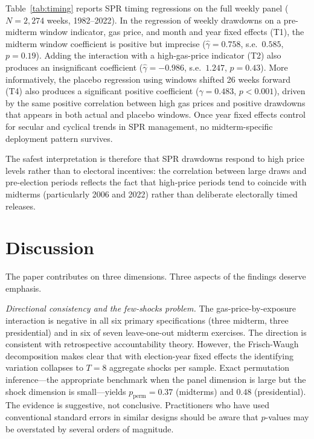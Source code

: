 \documentclass[12pt]{article}
\begin{document}
Table~\ref{tab:timing} reports SPR timing regressions on the full weekly panel ($N=2{,}274$ weeks, 1982--2022). In the regression of weekly drawdowns on a pre-midterm window indicator, gas price, and month and year fixed effects (T1), the midterm window coefficient is positive but imprecise ($\hat\gamma=0.758$, s.e.\ $0.585$, $p=0.19$). Adding the interaction with a high-gas-price indicator (T2) also produces an insignificant coefficient ($\hat\gamma=-0.986$, s.e.\ $1.247$, $p=0.43$). More informatively, the placebo regression using windows shifted 26 weeks forward (T4) also produces a significant positive coefficient ($\hat\gamma=0.483$, $p<0.001$), driven by the same positive correlation between high gas prices and positive drawdowns that appears in both actual and placebo windows. Once year fixed effects control for secular and cyclical trends in SPR management, no midterm-specific deployment pattern survives.

The safest interpretation is therefore that SPR drawdowns respond to high price levels rather than to electoral incentives: the correlation between large draws and pre-election periods reflects the fact that high-price periods tend to coincide with midterms (particularly 2006 and 2022) rather than deliberate electorally timed releases.

\section{Discussion}
\label{sec:discuss}

The paper contributes on three dimensions. Three aspects of the findings deserve emphasis.

\textit{Directional consistency and the few-shocks problem.} The gas-price-by-exposure interaction is negative in all six primary specifications (three midterm, three presidential) and in six of seven leave-one-out midterm exercises. The direction is consistent with retrospective accountability theory. However, the Frisch-Waugh decomposition makes clear that with election-year fixed effects the identifying variation collapses to $T=8$ aggregate shocks per sample. Exact permutation inference---the appropriate benchmark when the panel dimension is large but the shock dimension is small---yields $p_{\text{perm}}=0.37$ (midterms) and $0.48$ (presidential). The evidence is suggestive, not conclusive. Practitioners who have used conventional standard errors in similar designs should be aware that $p$-values may be overstated by several orders of magnitude.
\end{document}
